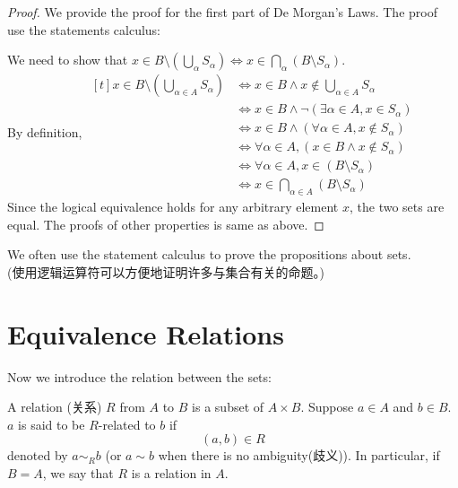 \documentclass[
	UTF-8,
	11pt, %
	a4paper, %
]{LegrandOrangeBook}
\begin{document}
\begin{proof}
We provide the proof for the first part of De Morgan's Laws. 
The proof use the statements calculus:

We need to show that $x \in B \setminus \left( \bigcup_{\alpha} S_\alpha \right) \iff x \in \bigcap_{\alpha} (B \setminus S_\alpha)$.\\
By definition, 
$
\begin{aligned}[t]
    x \in B \setminus \left( \bigcup_{\alpha \in A} S_\alpha \right) 
    & \iff x \in B \land x \notin \bigcup_{\alpha \in A} S_\alpha \\
    & \iff x \in B \land \neg \left( \exists \alpha \in A, x \in S_\alpha \right) \\
    & \iff x \in B \land \left( \forall \alpha \in A, x \notin S_\alpha \right) \\
    & \iff \forall \alpha \in A, (x \in B \land x \notin S_\alpha) \\
    & \iff \forall \alpha \in A, x \in (B \setminus S_\alpha) \\
    & \iff x \in \bigcap_{\alpha \in A} (B \setminus S_\alpha)
\end{aligned}
$\\
Since the logical equivalence holds for any arbitrary element $x$, the two sets are equal.
The proofs of other properties is same as above.
\end{proof}

\begin{remark}
	We often use the statement calculus to prove the propositions about sets.\\
	(使用逻辑运算符可以方便地证明许多与集合有关的命题。)
\end{remark}

\newpage

\section{Equivalence Relations}

Now we introduce the relation between the sets:

\begin{definition}[Relation]
	A relation (关系) $R$ from $A$ to $B$ is a subset of $A × B$. Suppose $a \in A$ and $b \in B$. $a$ is said to
	be $R$-related to $b$ if $$(a, b) \in R$$ denoted by $a \sim_R b$ (or $a \sim b$ when there is no ambiguity(歧义)). In particular, if
	$B = A$, we say that $R$ is a relation in $A$.
\end{definition}
\end{document}
